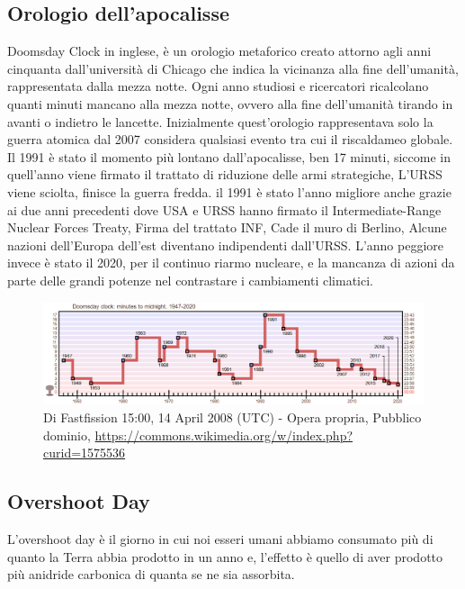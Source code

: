 \documentclass[12pt]{book} %
\begin{document}
\bigskip

\subsection[Orologio dell{}'apocalisse]{Orologio dell'apocalisse}
Doomsday Clock in inglese, è un orologio metaforico creato attorno agli anni cinquanta
dall'università di Chicago che indica la vicinanza alla fine dell'umanità,
rappresentata dalla mezza notte. Ogni anno studiosi e ricercatori ricalcolano quanti minuti mancano alla mezza notte,
ovvero alla fine dell'umanità tirando in avanti o indietro le lancette. Inizialmente
quest'orologio rappresentava solo la guerra atomica dal 2007 considera qualsiasi evento tra cui il
riscaldameo globale. Il 1991 è stato il momento più lontano dall'apocalisse, ben 17 minuti,
siccome in quell'anno viene firmato il trattato di riduzione delle armi strategiche, L'URSS viene sciolta, finisce la
guerra fredda. il 1991 è stato l'anno migliore anche grazie ai due anni precedenti dove USA e URSS hanno firmato il
Intermediate-Range Nuclear Forces Treaty, Firma del trattato INF, Cade il muro di Berlino, Alcune nazioni dell'Europa
dell'est diventano indipendenti dall'URSS. L'anno peggiore invece è stato il 2020, per il continuo
riarmo nucleare, e la mancanza di azioni da parte delle grandi potenze nel contrastare i cambiamenti climatici.

\begin{figure}[H]
  \centering
  \includegraphics[width=0.95\linewidth]{images/Libro-img018.png}
  \caption{Di Fastfission 15:00, 14 April 2008 (UTC) - Opera
propria, Pubblico dominio, \protect\url{https://commons.wikimedia.org/w/index.php?curid=1575536}}
\end{figure}

\subsection{Overshoot Day}
L'overshoot day è il giorno in cui noi esseri umani abbiamo consumato più di quanto la Terra abbia
prodotto in un anno e, l'effetto è quello di aver prodotto più anidride carbonica di quanta se ne
sia assorbita.
\end{document}
